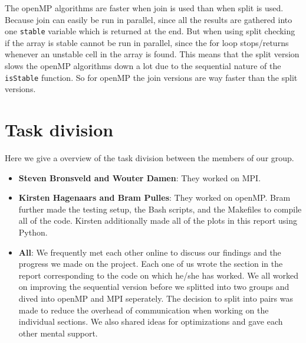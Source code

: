 \documentclass[a4paper]{article}
\begin{document}
The openMP algorithms are faster when join is used than when split is used. Because join can easily be run in parallel, since all the results are gathered into one \texttt{stable} variable which is returned at the end. But when using split checking if the array is stable cannot be run in parallel, since the for loop stops/returns whenever an unstable cell in the array is found. This means that the split version slows the openMP algorithms down a lot due to the sequential nature of the \texttt{isStable} function. So for openMP the join versions are way faster than the split versions.


\section{Task division}
Here we give a overview of the task division between the members of our group.
\begin{itemize}
    \item \textbf{Steven Bronsveld and Wouter Damen}: They worked on MPI.
    \item \textbf{Kirsten Hagenaars and Bram Pulles}: They worked on openMP. Bram further made the testing setup, the Bash scripts, and the Makefiles to compile all of the code. Kirsten additionally made all of the plots in this report using Python.
    \item \textbf{All}: We frequently met each other online to discuss our findings and the progress we made on the project. Each one of us wrote the section in the report corresponding to the code on which he/she has worked. We all worked on improving the sequential version before we splitted into two groups and dived into openMP and MPI seperately. The decision to split into pairs was made to reduce the overhead of communication when working on the individual sections. We also shared ideas for optimizations and gave each other mental support.
\end{itemize}
\end{document}
